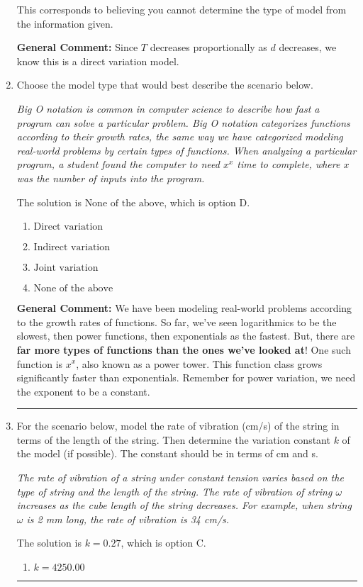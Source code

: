 \documentclass{extbook}[14pt]
\newcommand{\litem}[1]{\item #1

\rule{\textwidth}{0.4pt}}
\begin{document}
\begin{enumerate}
{\begin{enumerate}[label=\Alph*.]
This corresponds to believing you cannot determine the type of model from the information given.
\end{enumerate}

\textbf{General Comment:} Since $T$ decreases proportionally as $d$ decreases, we know this is a direct variation model.
}
\litem{
Choose the model type that would best describe the scenario below.

\begin{center}
    \textit{ Big O notation is common in computer science to describe how fast a program can solve a particular problem. Big O notation categorizes functions according to their growth rates, the same way we have categorized modeling real-world problems by certain types of functions. When analyzing a particular program, a student found the computer to need $x^x$ time to complete, where $x$ was the number of inputs into the program. }
\end{center}
The solution is \( \text{None of the above} \), which is option D.\begin{enumerate}[label=\Alph*.]
\item \( \text{Direct variation} \)


\item \( \text{Indirect variation} \)


\item \( \text{Joint variation} \)


\item \( \text{None of the above} \)


\end{enumerate}

\textbf{General Comment:} We have been modeling real-world problems according to the growth rates of functions. So far, we've seen logarithmics to be the slowest, then power functions, then exponentials as the fastest. But, there are \textbf{far more types of functions than the ones we've looked at}! One such function is $x^x$, also known as a power tower. This function class grows significantly faster than exponentials. Remember for power variation, we need the exponent to be a constant.
}
\litem{
For the scenario below, model the rate of vibration (cm/s) of the string in terms of the length of the string. Then determine the variation constant $k$ of the model (if possible). The constant should be in terms of cm and s.

\begin{center}
    \textit{ The rate of vibration of a string under constant tension varies based on the type of string and the length of the string. The rate of vibration of string $\omega$ increases as the cube length of the string decreases. For example, when string $\omega$ is 2 mm long, the rate of vibration is 34 cm/s. }
\end{center}
The solution is \( k = 0.27 \), which is option C.\begin{enumerate}[label=\Alph*.]
\item \( k = 4250.00 \)


\end{enumerate}}
\end{enumerate}
\end{document}
